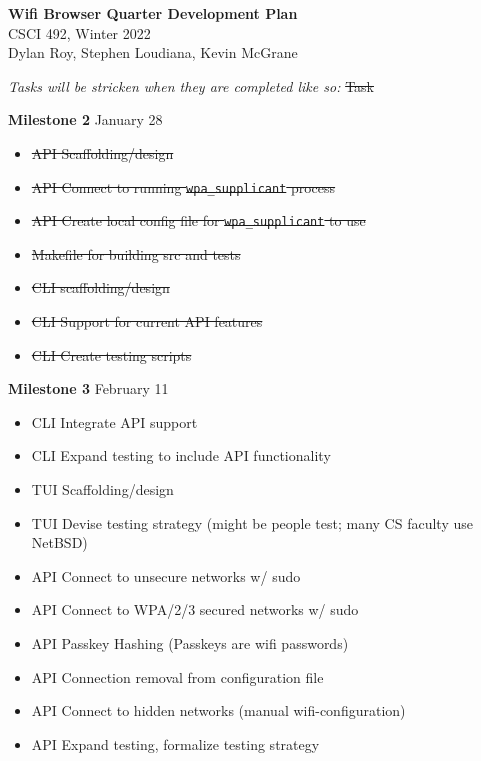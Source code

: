 \documentclass[11pt]{article}
\begin{document}
\begin{center}
  \textbf{\Large Wifi Browser Quarter Development Plan}\\\large CSCI 492, Winter 2022\\
  Dylan Roy, Stephen Loudiana, Kevin McGrane
\end{center}


\textit{Tasks will be stricken when they are completed like so:} \sout{Task}

\textbf{Milestone 2} January 28
\begin{itemize}
  \item \sout{API Scaffolding/design}
  \item \sout{API Connect to running \texttt{wpa\_supplicant} process}
  \item \sout{API Create local config file for \texttt{wpa\_supplicant} to use}
  \item \sout{Makefile for building src and tests}
  \item \sout{CLI scaffolding/design}
  \item \sout{CLI Support for current API features}
  \item \sout{CLI Create testing scripts}
\end{itemize}

\textbf{Milestone 3} February 11
\begin{itemize}
  \item CLI Integrate API support
  \item CLI Expand testing to include API functionality
  \item TUI Scaffolding/design
  \item TUI Devise testing strategy (might be people test; many CS faculty use NetBSD)
  \item API Connect to unsecure networks w/ sudo
  \item API Connect to WPA/2/3 secured networks w/ sudo
  \item API Passkey Hashing (Passkeys are wifi passwords)
  \item API Connection removal from configuration file
  \item API Connect to hidden networks (manual wifi-configuration)
  \item API Expand testing, formalize testing strategy
\end{itemize}
\end{document}
